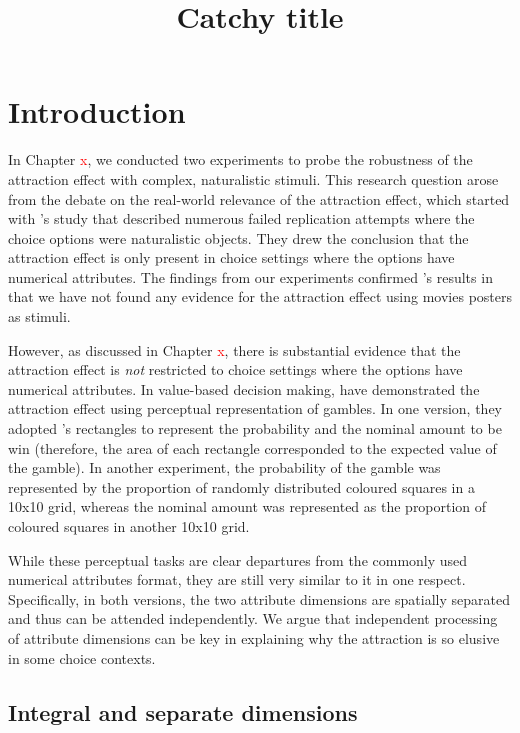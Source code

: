 \documentclass[11pt,a4paper]{article}
\date{}
\title{\huge{Catchy title}}
\begin{document}
\maketitle


\section{Introduction} 

In Chapter \textcolor{red}{x}, we conducted two experiments to probe the robustness of the attraction effect with complex, naturalistic stimuli. This research question arose from the debate on the real-world relevance of the attraction effect, which started with \citeauthor{Frederick2014a}'s study that described numerous failed replication attempts where the choice options were naturalistic objects. They drew the conclusion that the attraction effect is only present in choice settings where the options have numerical attributes. The findings from our experiments confirmed \citeauthor{Frederick2014a}'s results in that we have not found any evidence for the attraction effect using movies posters as stimuli.

However, as discussed in Chapter \textcolor{red}{x}, there is substantial evidence that the attraction effect is \textit{not} restricted to choice settings where the options have numerical attributes. In value-based decision making,  have demonstrated the attraction effect using perceptual representation of gambles. In one version, they adopted 's rectangles to represent the probability and the nominal amount to be win (therefore, the area of each rectangle corresponded to the expected value of the gamble). In another experiment, the probability of the gamble was represented by the proportion of randomly distributed coloured squares in a 10x10 grid, whereas the nominal amount was represented as the proportion of coloured squares in another 10x10 grid. 

While these perceptual tasks are clear departures from the commonly used numerical attributes format, they are still very similar to it in one respect. Specifically, in both versions, the two attribute dimensions are spatially separated and thus can be attended independently. We argue that independent processing of attribute dimensions can be key in explaining why the attraction is so elusive in some choice contexts.

\subsection{Integral and separate dimensions} 
\end{document}
